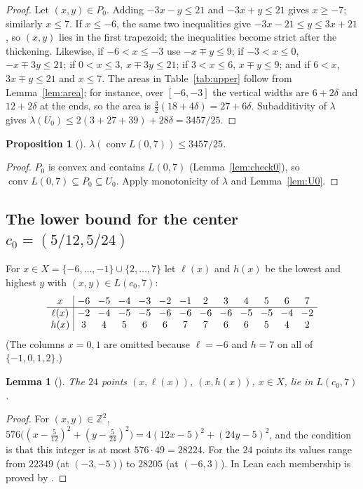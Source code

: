 \documentclass[11pt]{amsart}
\theoremstyle{plain}
\newtheorem{lemma}[theorem]{Lemma}
\newtheorem{proposition}[theorem]{Proposition}
\theoremstyle{definition}
\newcommand{\Z}{\mathbb{Z}}
\DeclareMathOperator{\conv}{conv}
\newcommand{\vol}{\lambda}
\begin{document}
\begin{proof}
Let $(x,y)\in P_0$. Adding $-3x-y\le21$ and $-3x+y\le21$ gives $x\ge-7$; similarly $x\le7$. If $x\le-6$, the same two inequalities give $-3x-21\le y\le 3x+21$, so $(x,y)$ lies in the first trapezoid; the inequalities become strict after the thickening. Likewise, if $-6<x\le-3$ use $-x\mp y\le9$; if $-3<x\le0$, $-x\mp3y\le21$; if $0<x\le3$, $x\mp3y\le21$; if $3<x\le6$, $x\mp y\le9$; and if $6<x$, $3x\mp y\le21$ and $x\le7$.
The areas in Table~\ref{tab:upper} follow from Lemma~\ref{lem:area}; for instance, over $[-6,-3]$ the vertical widths are $6+2\delta$ and $12+2\delta$ at the ends, so the area is $\tfrac32(18+4\delta)=27+6\delta$. Subadditivity of $\vol$ gives $\vol(U_0)\le 2(3+27+39)+28\delta=3457/25$.
\end{proof}

\begin{proposition}[]\label{prop:upper}
$\vol(\conv L(0,7))\le 3457/25$.
\end{proposition}

\begin{proof}
$P_0$ is convex and contains $L(0,7)$ (Lemma~\ref{lem:check0}), so $\conv L(0,7)\subseteq P_0\subseteq U_0$. Apply monotonicity of $\vol$ and Lemma~\ref{lem:U0}.
\end{proof}

\subsection{The lower bound for the center $c_0=(5/12,5/24)$}
For $x\in X=\{-6,\dots,-1\}\cup\{2,\dots,7\}$ let $\ell(x)$ and $h(x)$ be the lowest and highest $y$ with $(x,y)\in L(c_0,7)$:
\[
\setlength{\arraycolsep}{4pt}
\begin{array}{c|cccccccccccc}
x & -6 & -5 & -4 & -3 & -2 & -1 & 2 & 3 & 4 & 5 & 6 & 7\\\hline
\ell(x) & -2 & -4 & -5 & -5 & -6 & -6 & -6 & -6 & -5 & -5 & -4 & -2\\
h(x) & 3 & 4 & 5 & 6 & 6 & 7 & 7 & 6 & 6 & 5 & 4 & 2
\end{array}
\]
(The columns $x=0,1$ are omitted because $\ell=-6$ and $h=7$ on all of $\{-1,0,1,2\}$.)

\begin{lemma}[]\label{lem:points}
The $24$ points $(x,\ell(x))$, $(x,h(x))$, $x\in X$, lie in $L(c_0,7)$.
\end{lemma}

\begin{proof}
For $(x,y)\in\Z^2$, $576\bigl((x-\tfrac5{12})^2+(y-\tfrac5{24})^2\bigr)=4(12x-5)^2+(24y-5)^2$, and the condition is that this integer is at most $576\cdot49=28224$. For the $24$ points its values range from $22349$ (at $(-3,-5)$) to $28205$ (at $(-6,3)$). In Lean each membership is proved by .
\end{proof}
\end{document}
